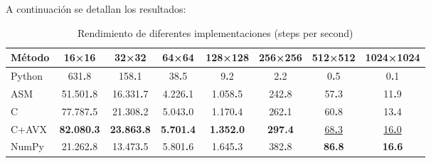 \documentclass[a4paper]{article}
\begin{document}
A continuación se detallan los resultados:

\begin{table}[h]
    \centering
    \caption{Rendimiento de diferentes implementaciones (steps per second)}
    \label{tab:performance_results}
    \begin{tabular}{lccccccc}
        \toprule
        \textbf{Método} & \textbf{16×16}             & \textbf{32×32}             & \textbf{64×64}            & \textbf{128×128}          & \textbf{256×256}        & \textbf{512×512}          & \textbf{1024×1024}        \\
        \midrule
        Python          & 631\textbf{.}8             & 158\textbf{.}1             & 38\textbf{.}5             & 9\textbf{.}2              & 2\textbf{.}2            & 0\textbf{.}5              & 0\textbf{.}1              \\
        ASM             & 51.501\textbf{.}8          & 16.331\textbf{.}7          & 4.226\textbf{.}1          & 1.058\textbf{.}5          & 242\textbf{.}8          & 57\textbf{.}3             & 11\textbf{.}9             \\
        C               & 77.787\textbf{.}5          & 21.308\textbf{.}2          & 5.043\textbf{.}0          & 1.170\textbf{.}4          & 262\textbf{.}1          & 60\textbf{.}8             & 13\textbf{.}4             \\
        C+AVX           & \textbf{82.080\textbf{.}3} & \textbf{23.863\textbf{.}8} & \textbf{5.701\textbf{.}4} & \textbf{1.352\textbf{.}0} & \textbf{297\textbf{.}4} & \underline{68\textbf{.}3} & \underline{16\textbf{.}0} \\
        NumPy           & 21.262\textbf{.}8          & 13.473\textbf{.}5          & 5.801\textbf{.}6          & 1.645\textbf{.}3          & 382\textbf{.}8          & \textbf{86\textbf{.}8}    & \textbf{16\textbf{.}6}    \\
        \bottomrule
    \end{tabular}
\end{table}
\end{document}

